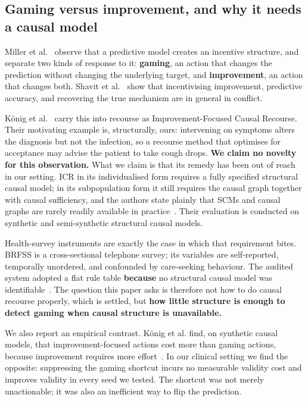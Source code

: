 \documentclass[conference]{IEEEtran}
\begin{document}
\subsection{Gaming versus improvement, and why it needs a causal model}
Miller et al.~\cite{miller2020} observe that a predictive model creates an incentive structure, and separate two kinds of response to it: \textbf{gaming}, an action that changes the prediction without changing the underlying target, and \textbf{improvement}, an action that changes both. Shavit et al.~\cite{shavit2020} show that incentivising improvement, predictive accuracy, and recovering the true mechanism are in general in conflict.

K\"onig et al.~\cite{konig2023} carry this into recourse as Improvement-Focused Causal Recourse. Their motivating example is, structurally, ours: intervening on symptoms alters the diagnosis but not the infection, so a recourse method that optimises for acceptance may advise the patient to take cough drops. \textbf{We claim no novelty for this observation.} What we claim is that its remedy has been out of reach in our setting. ICR in its individualised form requires a fully specified structural causal model; in its subpopulation form it still requires the causal graph together with causal sufficiency, and the authors state plainly that SCMs and causal graphs are rarely readily available in practice~\cite{konig2023}. Their evaluation is conducted on synthetic and semi-synthetic structural causal models.

Health-survey instruments are exactly the case in which that requirement bites. BRFSS is a cross-sectional telephone survey; its variables are self-reported, temporally unordered, and confounded by care-seeking behaviour. The audited system adopted a flat rule table \textbf{because} no structural causal model was identifiable~\cite{thieu2026}. The question this paper asks is therefore not how to do causal recourse properly, which is settled, but \textbf{how little structure is enough to detect gaming when causal structure is unavailable.}

We also report an empirical contrast. K\"onig et al. find, on synthetic causal models, that improvement-focused actions cost more than gaming actions, because improvement requires more effort~\cite{konig2023}. In our clinical setting we find the opposite: suppressing the gaming shortcut incurs no measurable validity cost and improves validity in every seed we tested. The shortcut was not merely unactionable; it was also an inefficient way to flip the prediction.
\end{document}
